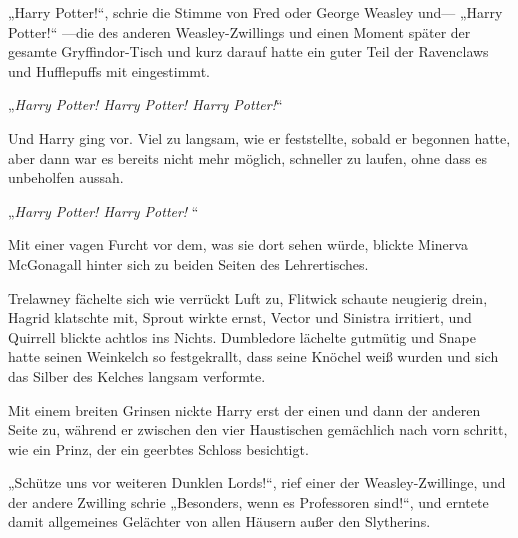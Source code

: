 „Harry Potter!“, schrie die Stimme von Fred oder George Weasley und— „Harry Potter!“ —die des anderen Weasley-Zwillings und einen Moment später der gesamte Gryffindor-Tisch und kurz darauf hatte ein guter Teil der Ravenclaws und Hufflepuffs mit eingestimmt.

„\emph{Harry Potter! Harry Potter! Harry Potter!}“

Und Harry ging vor. Viel zu langsam, wie er feststellte, sobald er begonnen hatte, aber dann war es bereits nicht mehr möglich, schneller zu laufen, ohne dass es unbeholfen aussah.

\later

„\emph{Harry Potter! Harry Potter! }“


Mit einer vagen Furcht vor dem, was sie dort sehen würde, blickte Minerva McGonagall hinter sich zu beiden Seiten des Lehrertisches.

Trelawney fächelte sich wie verrückt Luft zu, Flitwick schaute neugierig drein, Hagrid klatschte mit, Sprout wirkte ernst, Vector und Sinistra irritiert, und Quirrell blickte achtlos ins Nichts. Dumbledore lächelte gutmütig und Snape hatte seinen Weinkelch so festgekrallt, dass seine Knöchel weiß wurden und sich das Silber des Kelches langsam verformte.

Mit einem breiten Grinsen nickte Harry erst der einen und dann der anderen Seite zu, während er zwischen den vier Haustischen gemächlich nach vorn schritt, wie ein Prinz, der ein geerbtes Schloss besichtigt.

„Schütze uns vor weiteren Dunklen Lords!“, rief einer der Weasley-Zwillinge, und der andere Zwilling schrie „Besonders, wenn es Professoren sind!“, und erntete damit allgemeines Gelächter von allen Häusern außer den Slytherins.

